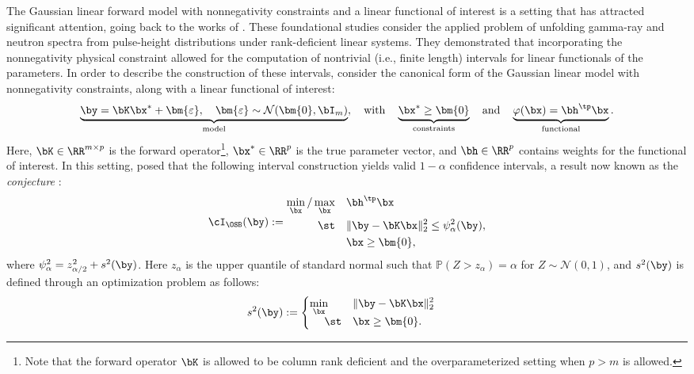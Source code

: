 \documentclass[11pt]{article}
\numberwithin{equation}{section}
\numberwithin{figure}{section}
\begin{document}
The Gaussian linear forward model with nonnegativity constraints and a linear functional of interest is a setting that has attracted significant attention, going back to the works of \cite{burrus1965utilization, rust_burrus}. 
These foundational studies consider the applied problem of unfolding gamma-ray and neutron spectra from pulse-height distributions under rank-deficient linear systems.
They demonstrated that incorporating the nonnegativity physical constraint allowed for the computation of nontrivial (i.e., finite length) intervals for linear functionals of the parameters.
In order to describe the construction of these intervals, consider the canonical form of the Gaussian linear model with nonnegativity constraints, along with a linear functional of interest:
\begin{equation}\label{eq:lineargaussianmodel}
\underbrace{\by = \bK\bx^* + \bm{\varepsilon}, \quad \bm{\varepsilon} \sim \mathcal{N}(\bm{0}, \bI_m)}_{\text{model}}, \quad \text{with} \quad \underbrace{\bx^* \geq \bm{0}}_{\text{constraints}} \quad \text{and} \quad \underbrace{\varphi(\bx) = \bh^\tp \bx}_{\text{functional}}.
\end{equation}
Here, $\bK \in \RR^{m \times p}$ is the forward operator\footnote{Note that the forward operator $\bK$ is allowed to be column rank deficient and the overparameterized setting when $p > m$ is allowed.}, $\bx^* \in \RR^p$ is the true parameter vector, and $\bh \in \RR^p$ contains weights for the functional of interest. 
In this setting, \cite{burrus1965utilization, rust_burrus} posed that the following interval construction yields valid $1-\alpha$ confidence intervals, a result now known as the \emph{\rustburrus conjecture} \cite{rust1994confidence}:
\begin{equation}\label{RB1}
\cI_{\OSB}(\by)
:=
\begin{aligned}
\min_{\bx}/\max_{\bx} \quad & \bh^\tp\bx \\
\st \quad &\Vert \by - 
\bK\bx \Vert_2^2 \leq \psi^2_\alpha(\by),\\
  & \bx \geq \bm{0},  \\
\end{aligned}
\end{equation}
where $\psi^2_\alpha = z_{\alpha/2}^2 + s^2(\by)$. Here $z_\alpha$ is the upper quantile of standard normal such that $\mathbb{P}(Z>z_\alpha) = \alpha$ for $Z \sim \mathcal{N}(0,1)$, and $s^2(\by)$ is defined through an optimization problem as follows: 
\begin{equation}\label{RB2}
\begin{aligned}
s^2(\by) :=
\begin{cases}
\begin{aligned}
    \min_{\bx} \:\qquad & \Vert \by - \bK\bx\Vert^2_2 \\ 
    \st \quad & \bx \geq \bm{0}.
\end{aligned}    
\end{cases}
\end{aligned}
\end{equation}
 
\end{document}
